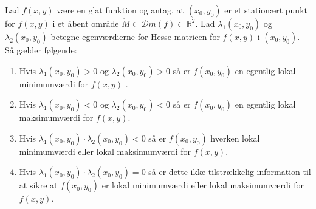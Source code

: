 \begin{lemma} \label{lemmaEkstrema2Var}
Lad $f(x,y)$ være en glat funktion og antag, at $(x_{0}, y_{0})$ er et stationært punkt for $f(x,y)$ i et åbent område $\mathring{M} \subset \mathcal{D}m(f) \subset \mathbb{R}^{2}$. Lad $\lambda_{1}(x_{0}, y_{0})$ og $\lambda_{2}(x_{0}, y_{0})$ betegne egenværdierne for Hesse-matricen for $f(x,y)$ i $(x_{0}, y_{0})$.
Så gælder følgende:
\begin{enumerate}
\item Hvis $\lambda_{1}(x_{0}, y_{0}) > 0 $ og $\lambda_{2}(x_{0}, y_{0}) >0$  så er  $f(x_{0}, y_{0})$ en egentlig lokal minimumværdi for $f(x,y)$ .
\item Hvis $\lambda_{1}(x_{0}, y_{0}) < 0 $ og $\lambda_{2}(x_{0}, y_{0}) <0$ så er $f(x_{0}, y_{0})$ en egentlig lokal maksimumværdi for $f(x,y)$.
\item Hvis $\lambda_{1}(x_{0}, y_{0})\cdot \lambda_{2}(x_{0}, y_{0}) < 0 $ så er $f(x_{0}, y_{0})$ hverken  lokal minimumværdi eller lokal maksimumværdi for $f(x,y)$.
\item Hvis $\lambda_{1}(x_{0}, y_{0})\cdot \lambda_{2}(x_{0}, y_{0}) =  0 $ så er dette ikke tilstrækkelig information til at sikre at $f(x_{0}, y_{0})$ er lokal minimumværdi eller lokal maksimumværdi for $f(x,y)$.
\end{enumerate}
\end{lemma}

